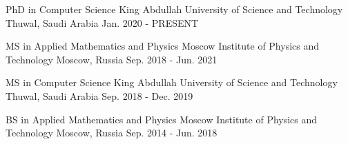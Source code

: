 


\begin{cventries}


\cventry
{PhD in Computer Science } %
{King Abdullah University of Science and Technology} %
{Thuwal, Saudi Arabia} %
{Jan. 2020 - PRESENT} %
{
}

\cventry
{MS in Applied Mathematics and Physics} %
{Moscow Institute of Physics and Technology} %
{Moscow, Russia} %
{Sep. 2018 - Jun. 2021} %
{ %
}

\cventry
{MS in Computer Science } %
{King Abdullah University of Science and Technology} %
{Thuwal, Saudi Arabia} %
{Sep. 2018 - Dec. 2019} %
{
}

\cventry
{BS in Applied Mathematics and Physics} %
{Moscow Institute of Physics and Technology} %
{Moscow, Russia} %
{Sep. 2014 - Jun. 2018} %
{ %
}


\end{cventries}